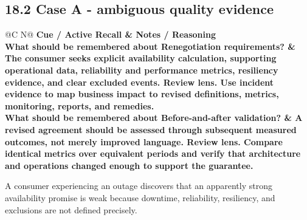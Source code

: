 \documentclass[11pt]{article}
\newcommand{\CornellHeader}{\rowcolor{Navy}\color{white}\bfseries Cue / Active Recall & \color{white}\bfseries Notes / Reasoning \\\endhead}
\newcommand{\CornellRow}[2]{\cellcolor{CueGray}\textbf{#1} & #2 \\\addlinespace[3pt]}
\begin{document}
\subsection{18.2 Case A - ambiguous quality evidence}
\begin{longtable}{@{}C N@{}}
\CornellHeader
\CornellRow{What should be remembered about Renegotiation requirements?}{The consumer seeks explicit availability calculation, supporting operational data, reliability and performance metrics, resiliency evidence, and clear excluded events. \textbf{Review lens.} Use incident evidence to map business impact to revised definitions, metrics, monitoring, reports, and remedies.}
\CornellRow{What should be remembered about Before-and-after validation?}{A revised agreement should be assessed through subsequent measured outcomes, not merely improved language. \textbf{Review lens.} Compare identical metrics over equivalent periods and verify that architecture and operations changed enough to support the guarantee.}
\end{longtable}
\begin{sectionsummarybox}
A consumer experiencing an outage discovers that an apparently strong availability promise is weak because downtime, reliability, resiliency, and exclusions are not defined precisely.
\end{sectionsummarybox}
\end{document}
